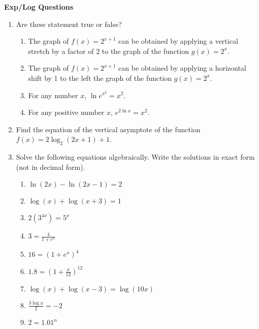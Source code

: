 \documentclass[11pt]{article}
\begin{document}
\centerline{\textbf{Exp/Log Questions}}

\vspace{.5in}






        
\begin{enumerate} 

\item Are these statement true or false? 
\begin{enumerate}
\item The graph of $\displaystyle f(x) = 2^{x+1}$ can be obtained by applying a vertical stretch by a factor of 2 to
the graph of the function $\displaystyle g(x) = 2^x$.
\item The graph of $\displaystyle f(x) = 2^{x+1}$ can be obtained by applying a horizontal shift by 1 to the left
the graph of the function $\displaystyle g(x) = 2^x$.
\item  For any number $x$, $\displaystyle \ln e^{x^2}=x^2$.
\item  For any positive number $x$, $\displaystyle  e^{2\ln x}=x^2$.

\end{enumerate}
\item Find the equation of the vertical asymptote of the function $\displaystyle f(x)=2\log_2(2x+1) +1$.
\item  Solve the following equations algebraically. Write the solutions in exact form (not in decimal form).
\begin{enumerate}
\item $\displaystyle \ln(2x) - \ln(2x - 1) = 2$
\item $\displaystyle \log(x)+\log(x+3)=1$
\item $\displaystyle 2\left (3^{4x}\right )=5^x$
\item $\displaystyle 3=\frac{4}{1+e^x}$
\item $\displaystyle 16=\left (1+e^x\right )^4$
\item $\displaystyle 1.8=\left (1+\frac{x}{12}\right )^{12}$
\item $\displaystyle \log(x)+\log(x-3)=\log(10x)$
\item $\displaystyle \frac{3\log x}{2}= -2$
\item $\displaystyle 2 = 1.01^n$


\end{enumerate}
\end{enumerate}
\end{document}
